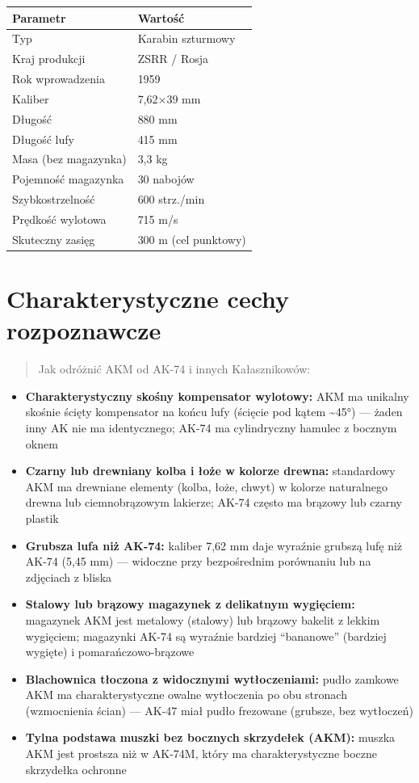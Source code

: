 \documentclass[12pt,openany,oneside]{book}
\providecommand{\tightlist}{%
  \setlength{\itemsep}{0pt}\setlength{\parskip}{0pt}}
\begin{document}
\begin{longtable}[]{@{}ll@{}}
\toprule\noalign{}
Parametr & Wartość \\
\midrule\noalign{}
\endhead
\bottomrule\noalign{}
\endlastfoot
Typ & Karabin szturmowy \\
Kraj produkcji & ZSRR / Rosja \\
Rok wprowadzenia & 1959 \\
Kaliber & 7,62×39 mm \\
Długość & 880 mm \\
Długość lufy & 415 mm \\
Masa (bez magazynka) & 3,3 kg \\
Pojemność magazynka & 30 nabojów \\
Szybkostrzelność & 600 strz./min \\
Prędkość wylotowa & 715 m/s \\
Skuteczny zasięg & 300 m (cel punktowy) \\
\end{longtable}

\section{Charakterystyczne cechy
rozpoznawcze}\label{charakterystyczne-cechy-rozpoznawcze-46}

\begin{quote}
Jak odróżnić AKM od AK-74 i innych Kałasznikowów:
\end{quote}

\begin{itemize}
\tightlist
\item
  \textbf{Charakterystyczny skośny kompensator wylotowy:} AKM ma
  unikalny skośnie ścięty kompensator na końcu lufy (ścięcie pod kątem
  \textasciitilde45°) --- żaden inny AK nie ma identycznego; AK-74 ma
  cylindryczny hamulec z bocznym oknem
\item
  \textbf{Czarny lub drewniany kolba i łoże w kolorze drewna:}
  standardowy AKM ma drewniane elementy (kolba, łoże, chwyt) w kolorze
  naturalnego drewna lub ciemnobrązowym lakierze; AK-74 często ma
  brązowy lub czarny plastik
\item
  \textbf{Grubsza lufa niż AK-74:} kaliber 7,62 mm daje wyraźnie grubszą
  lufę niż AK-74 (5,45 mm) --- widoczne przy bezpośrednim porównaniu lub
  na zdjęciach z bliska
\item
  \textbf{Stalowy lub brązowy magazynek z delikatnym wygięciem:}
  magazynek AKM jest metalowy (stalowy) lub brązowy bakelit z lekkim
  wygięciem; magazynki AK-74 są wyraźnie bardziej ``bananowe'' (bardziej
  wygięte) i pomarańczowo-brązowe
\item
  \textbf{Blachownica tłoczona z widocznymi wytłoczeniami:} pudło
  zamkowe AKM ma charakterystyczne owalne wytłoczenia po obu stronach
  (wzmocnienia ścian) --- AK-47 miał pudło frezowane (grubsze, bez
  wytłoczeń)
\item
  \textbf{Tylna podstawa muszki bez bocznych skrzydełek (AKM):} muszka
  AKM jest prostsza niż w AK-74M, który ma charakterystyczne boczne
  skrzydełka ochronne
\end{itemize}
\end{document}
